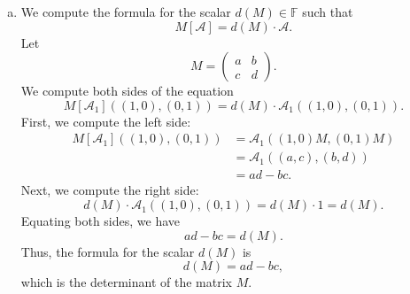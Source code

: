 \documentclass{article}
\begin{document}
\begin{enumerate}[a)]
\begin{enumerate}[1.]
\begin{proof}
      \end{proof}
      \item \begin{proof}
         From part (1), we have that any $\mathscr{A} \in \Lambda(\mathbb{F}^2_{\text{col}})$ is completely determined by the value $\mathscr{A}((1,0),(0,1))$. Thus, we can define a linear transformation $\Phi: \Lambda(\mathbb{F}^2_{\text{col}}) \to \mathbb{F}$ by $\Phi(\mathscr{A}) = \mathscr{A}((1,0),(0,1))$. This map is linear and surjective. The kernel of this map is the set of all $\mathscr{A}$ such that $\mathscr{A}((1,0),(0,1)) = 0$. But from part (1), this means that $\mathscr{A}$ is the zero map. Thus, the kernel is trivial, so $\Phi$ is injective. Hence, $\Phi$ is an isomorphism. Since $\mathbb{F}$ is 1-dimensional, we have that $\Lambda(\mathbb{F}^2_{\text{col}})$ is also 1-dimensional.
      \end{proof}
      \item \begin{proof}
         Let $\mathscr{A}_1 \in \Lambda(\mathbb{F}^2_{\text{col}})$ be such that $\mathscr{A}_1((1,0),(0,1)) = 1$. For any $(x,y), (x',y') \in \mathbb{F}^2_{\text{col}}$, we have
         \begin{align*}
            \mathscr{A}_1((x,y),(x',y')) &= \mathscr{A}_1(x(1,0) + y(0,1), x'(1,0) + y'(0,1)) \\
            &= xx'\mathscr{A}_1((1,0),(1,0)) + xy'\mathscr{A}_1((1,0),(0,1)) + yx'\mathscr{A}_1((0,1),(1,0)) + yy'\mathscr{A}_1((0,1),(0,1)) \\
            &= xy' \cdot 1 + yx' \cdot (-1) \\
            &= xy' - yx'.
         \end{align*}
         Thus, $\mathscr{A}_1((x,y),(x',y')) = xy' - yx'$.
      \end{proof}
   \end{enumerate}
   \item We compute the formula for the scalar $d(M) \in \mathbb{F}$ such that 
      \[
         M[\mathscr{A}] = d(M) \cdot \mathscr{A}.
      \]
      Let 
      \[
         M = \begin{pmatrix}
            a & b \\
            c & d
         \end{pmatrix}.
      \]
      We compute both sides of the equation
      \[
         M[\mathscr{A}_1]((1,0),(0,1)) = d(M) \cdot \mathscr{A}_1((1,0),(0,1)).
      \]
      First, we compute the left side:
      \begin{align*}
         M[\mathscr{A}_1]((1,0),(0,1)) &= \mathscr{A}_1((1,0)M,(0,1)M) \\
         &= \mathscr{A}_1((a,c),(b,d)) \\
         &= ad - bc.
      \end{align*}
      Next, we compute the right side:
      \[
         d(M) \cdot \mathscr{A}_1((1,0),(0,1)) = d(M) \cdot 1 = d(M).
      \]
      Equating both sides, we have
      \[
         ad - bc = d(M).
      \]
      Thus, the formula for the scalar $d(M)$ is 
      \[
         d(M) = ad - bc,
      \]
      which is the determinant of the matrix $M$.
\end{enumerate}
\end{document}
